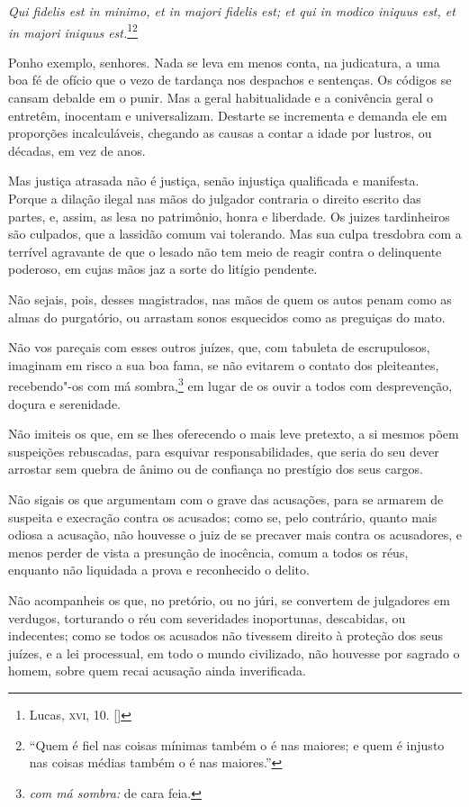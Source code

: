 \textit{Qui fidelis est in minimo, et in majori fidelis est; et
qui in modico iniquus est, et in majori iniquus
est.}\footnote[*]{ Lucas, \textsc{xvi}, 10. []}\footnote{“Quem é fiel nas coisas mínimas também o é nas maiores; e quem é injusto nas
coisas médias também o é nas maiores.”} 

Ponho exemplo, senhores. Nada se leva em menos conta, na
judicatura, a uma boa fé de ofício que o vezo de tardança nos despachos
e sentenças. Os códigos se cansam debalde em o punir. Mas a geral
habitualidade e a conivência geral o entretêm, inocentam e
universalizam. Destarte se incrementa e demanda ele em proporções
incalculáveis, chegando as causas a contar a idade por lustros, ou
décadas, em vez de anos.

Mas justiça atrasada não é justiça, senão injustiça qualificada e
manifesta. Porque a dilação ilegal nas mãos do julgador contraria o
direito escrito das partes, e, assim, as lesa no patrimônio, honra e
liberdade. Os juizes tardinheiros são culpados, que a lassidão comum
vai tolerando. Mas sua culpa tresdobra com a terrível agravante de que
o lesado não tem meio de reagir contra o delinquente poderoso, em cujas
mãos jaz a sorte do litígio pendente.

Não sejais, pois, desses magistrados, nas mãos de quem os autos
penam como as almas do purgatório, ou arrastam sonos esquecidos como as
preguiças do mato.

Não vos pareçais com esses outros juízes, que, com tabuleta de
escrupulosos, imaginam em risco a sua boa fama, se não evitarem o
contato dos pleiteantes, recebendo"-os com má sombra,\footnote{ \textit{com má sombra:} 
de cara feia.} em lugar de os
ouvir a todos com desprevenção, doçura e serenidade.

Não imiteis os que, em se lhes oferecendo o mais leve pretexto, a
si mesmos põem suspeições rebuscadas, para esquivar responsabilidades,
que seria do seu dever arrostar sem quebra de ânimo ou de confiança no
prestígio dos seus cargos.

Não sigais os que argumentam com o grave das acusações, para se
armarem de suspeita e execração contra os acusados; como se, pelo
contrário, quanto mais odiosa a acusação, não houvesse o juiz de se
precaver mais contra os acusadores, e menos perder de vista a presunção
de inocência, comum a todos os réus, enquanto não liquidada a prova e
reconhecido o delito.

Não acompanheis os que, no pretório, ou no júri, se convertem de
julgadores em verdugos, torturando o réu com severidades inoportunas,
descabidas, ou indecentes; como se todos os acusados não tivessem
direito à proteção dos seus juízes, e a lei processual, em todo o mundo
civilizado, não houvesse por sagrado o homem, sobre quem recai acusação
ainda inverificada.

